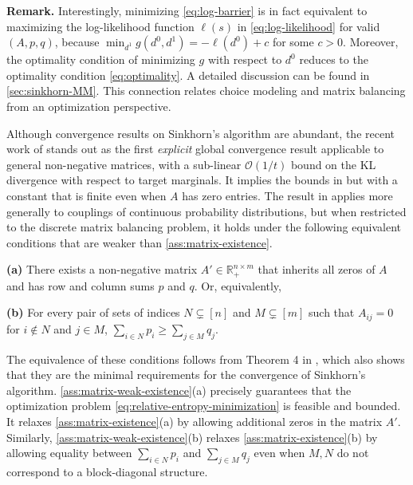 \textbf{Remark.} Interestingly, minimizing \eqref{eq:log-barrier} is in fact equivalent to maximizing the log-likelihood function $\ell(s)$ in \eqref{eq:log-likelihood} for valid $(A,p,q)$, because $\min_{d^1}g(d^0,d^1)=-\ell(d^0)+c$ for some $c>0$. Moreover, the optimality condition of minimizing $g$ with respect to $d^0$ reduces to the optimality condition \eqref{eq:optimality}. A detailed discussion can be found in \cref{sec:sinkhorn-MM}. This connection relates choice modeling and matrix balancing from an optimization perspective.
     
      Although convergence results on Sinkhorn's algorithm are abundant, the recent work of \citet{leger2021gradient} stands out as the first \emph{explicit} global convergence result applicable to general non-negative matrices, with a sub-linear $\mathcal O(1/t)$ bound on the KL divergence with respect to target marginals. It implies the bounds in \citet{chakrabarty2021better,altschuler2017near} but with a constant that is finite even when $A$ has zero entries. The result in \citet{leger2021gradient} applies more generally to couplings of continuous probability distributions, but when restricted to the discrete matrix balancing problem, it 
     holds under the following equivalent conditions that are weaker than \cref{ass:matrix-existence}.
\begin{assumption}
    \label{ass:matrix-weak-existence}
    
    \textbf{(a)} There exists a non-negative matrix $A'\in \mathbb{R}_+^{n\times m}$ that inherits all zeros of $A$ and has row and column sums $p$ and $q$. Or, equivalently,
    
\textbf{(b)} For every pair of sets of indices $N \subsetneq [n]$ and $M \subsetneq [m]$ such that $A_{ij}=0$ for $i\notin N$ and $j\in M$, $\sum_{i\in N}p_i \geq \sum_{j\in M}q_j$.
\end{assumption}

The equivalence of these conditions follows from Theorem 4 in \citet{pukelsheim2009iterative}, which also shows that they are the minimal requirements for the convergence of Sinkhorn's algorithm. \cref{ass:matrix-weak-existence}(a) precisely guarantees 
that the optimization problem \eqref{eq:relative-entropy-minimization} is feasible and bounded. It relaxes \cref{ass:matrix-existence}(a) by allowing additional zeros in the matrix $A'$. Similarly, \cref{ass:matrix-weak-existence}(b) relaxes \cref{ass:matrix-existence}(b) by allowing equality between $\sum_{i\in N}p_i$ and $\sum_{j\in M}q_j$ even when $M,N$ do not correspond to a block-diagonal structure. 


